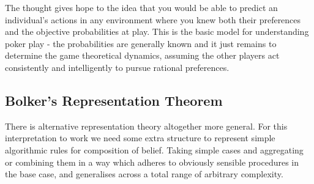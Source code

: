 \documentclass[]{tufte-book}
\theoremstyle{definition}
\theoremstyle{definition}
\theoremstyle{definition}
\theoremstyle{remark}
\begin{document}
The thought gives hope to the idea that you would be able to predict an individual's actions in any environment where you knew both their preferences and the objective probabilities at play. This is the basic model for understanding poker play - the probabilities are generally known and it just remains to determine the game theoretical dynamics, assuming the other players act consistently and intelligently to pursue rational preferences.

\hypertarget{bolkers-representation-theorem}{%
\subsection{Bolker's Representation Theorem}\label{bolkers-representation-theorem}}

There is alternative representation theory altogether more general. For this interpretation to work we need some extra structure to represent simple algorithmic rules for composition of belief. Taking simple cases and aggregating or combining them in a way which adheres to obviously sensible procedures in the base case, and generalises across a total range of arbitrary complexity.
\end{document}
